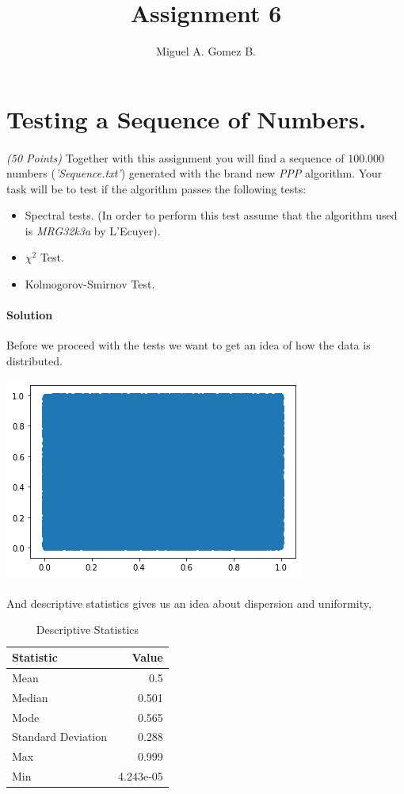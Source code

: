 \documentclass{article}
\title{Assignment 6}
\author{Miguel A. Gomez B.}
\begin{document}
	\maketitle
\section{Testing a Sequence of Numbers.}
\paragraph{}\textit{(50 Points)} Together with this assignment you will find a sequence of $100.000$ numbers (\textit{'Sequence.txt'}) generated with the brand new \textit{PPP} algorithm. Your task will be to test if the algorithm passes the following tests:
\begin{itemize}
	\item Spectral tests. (In order to perform this test assume that the algorithm used is \textit{MRG32k3a} by L'Ecuyer).
	\item $\chi^2$ Test.
	\item Kolmogorov-Smirnov Test.
\end{itemize}
\paragraph{Solution}Before we proceed with the tests we want to get an idea of how the data is distributed.
\begin{center}
	\includegraphics[width=0.5\linewidth]{distribution.png}
\end{center}
\paragraph{}And descriptive statistics gives us an idea about dispersion and uniformity,
\begin{table}[h!]
	\begin{center}
		\label{tab:table1}
		\begin{tabular}{|l|r|}
			\hline
			\textbf{Statistic} & \textbf{Value}\\
			\hline
			Mean & 0.5\\
			Median & 0.501\\
			Mode & 0.565\\
			Standard Deviation & 0.288\\
			Max & 0.999\\
			Min & 4.243e-05\\
			\bottomrule
		\end{tabular}
		\caption{Descriptive Statistics}
	\end{center}
\end{table}
\end{document}
